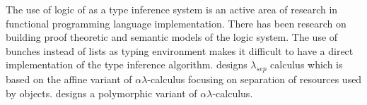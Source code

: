 The use of logic of \BI{} as a type inference system is an active area of research in functional programming language implementation.
There has been research on building proof theoretic and semantic models of the logic system\citep{pym_semantics_2002}. The use of bunches instead of
lists as typing environment makes it difficult to have a direct implementation of the type inference algorithm. \cite{atkey_lambda_sep_2004}
designs $\lambda_{sep}$ calculus which is based on the affine variant of $\alpha\lambda$-calculus focusing on separation of resources used by objects.
\cite{collinson_bunched_2005} designs a polymorphic variant of $\alpha\lambda$-calculus.

